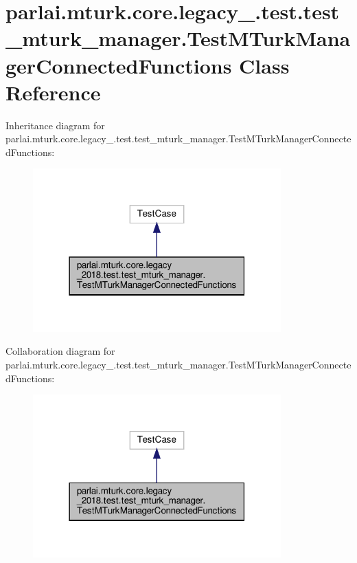 \hypertarget{classparlai_1_1mturk_1_1core_1_1legacy__2018_1_1test_1_1test__mturk__manager_1_1TestMTurkManagerConnectedFunctions}{}\section{parlai.\+mturk.\+core.\+legacy\+\_.\+test.\+test\+\_\+mturk\+\_\+manager.\+Test\+M\+Turk\+Manager\+Connected\+Functions Class Reference}
\label{classparlai_1_1mturk_1_1core_1_1legacy__2018_1_1test_1_1test__mturk__manager_1_1TestMTurkManagerConnectedFunctions}


Inheritance diagram for parlai.\+mturk.\+core.\+legacy\+\_.\+test.\+test\+\_\+mturk\+\_\+manager.\+Test\+M\+Turk\+Manager\+Connected\+Functions\+:\nopagebreak
\begin{figure}[H]
\begin{center}
\leavevmode
\includegraphics[width=271pt]{d6/dad/classparlai_1_1mturk_1_1core_1_1legacy__2018_1_1test_1_1test__mturk__manager_1_1TestMTurkManagere001427999a81d6c9d785f1c9fe5538c}
\end{center}
\end{figure}


Collaboration diagram for parlai.\+mturk.\+core.\+legacy\+\_.\+test.\+test\+\_\+mturk\+\_\+manager.\+Test\+M\+Turk\+Manager\+Connected\+Functions\+:\nopagebreak
\begin{figure}[H]
\begin{center}
\leavevmode
\includegraphics[width=271pt]{d5/d1d/classparlai_1_1mturk_1_1core_1_1legacy__2018_1_1test_1_1test__mturk__manager_1_1TestMTurkManagerConnectedFunctions__coll__graph}
\end{center}
\end{figure}
